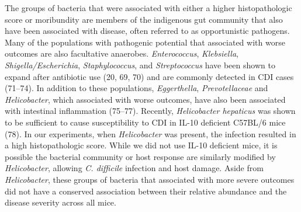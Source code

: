 \documentclass[
  12pt,
]{article}
\begin{document}
The groups of bacteria that were associated with either a higher
histopathologic score or moribundity are members of the indigenous gut
community that also have been associated with disease, often referred to
as opportunistic pathogens. Many of the populations with pathogenic
potential that associated with worse outcomes are also facultative
anaerobes. \emph{Enterococcus}, \emph{Klebsiella},
\emph{Shigella/Escherichia}, \emph{Staphylococcus}, and
\emph{Streptococcus} have been shown to expand after antibiotic use (20,
69, 70) and are commonly detected in CDI cases (71--74). In addition to
these populations, \emph{Eggerthella}, \emph{Prevotellaceae} and
\emph{Helicobacter}, which associated with worse outcomes, have also
been associated with intestinal inflammation (75--77). Recently,
\emph{Helicobacter hepaticus} was shown to be sufficient to cause
susceptibility to CDI in IL-10 deficient C57BL/6 mice (78). In our
experiments, when \emph{Helicobacter} was present, the infection
resulted in a high histopathologic score. While we did not use IL-10
deficient mice, it is possible the bacterial community or host response
are similarly modified by \emph{Helicobacter}, allowing \emph{C.
difficile} infection and host damage. Aside from \emph{Helicobacter},
these groups of bacteria that associated with more severe outcomes did
not have a conserved association between their relative abundance and
the disease severity across all mice.
\end{document}
